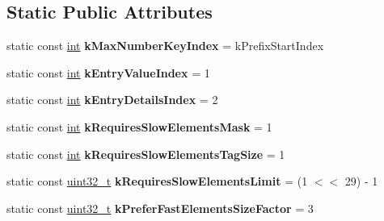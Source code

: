 \subsection*{Static Public Attributes}
\begin{DoxyCompactItemize}
\item 
\mbox{\label{classv8_1_1internal_1_1NumberDictionary_a3ebab9b43233e0ed0f5085d9d9de60d1}} 
static const \mbox{\hyperlink{classint}{int}} {\bfseries k\+Max\+Number\+Key\+Index} = k\+Prefix\+Start\+Index
\item 
\mbox{\label{classv8_1_1internal_1_1NumberDictionary_ae24255866e042546f2415291bbb2ce25}} 
static const \mbox{\hyperlink{classint}{int}} {\bfseries k\+Entry\+Value\+Index} = 1
\item 
\mbox{\label{classv8_1_1internal_1_1NumberDictionary_a76c8f74ae7a83709413dfa422b0cda31}} 
static const \mbox{\hyperlink{classint}{int}} {\bfseries k\+Entry\+Details\+Index} = 2
\item 
\mbox{\label{classv8_1_1internal_1_1NumberDictionary_ab0de5cae9e966f5527c9c24165b666e5}} 
static const \mbox{\hyperlink{classint}{int}} {\bfseries k\+Requires\+Slow\+Elements\+Mask} = 1
\item 
\mbox{\label{classv8_1_1internal_1_1NumberDictionary_aa874bb1a24bd0b237a6dfc4cf61110dc}} 
static const \mbox{\hyperlink{classint}{int}} {\bfseries k\+Requires\+Slow\+Elements\+Tag\+Size} = 1
\item 
\mbox{\label{classv8_1_1internal_1_1NumberDictionary_a74e939aa562f803d1aa7d74d2f30c2db}} 
static const \mbox{\hyperlink{classuint32__t}{uint32\+\_\+t}} {\bfseries k\+Requires\+Slow\+Elements\+Limit} = (1 $<$$<$ 29) -\/ 1
\item 
\mbox{\label{classv8_1_1internal_1_1NumberDictionary_a2516f94e1a76b8bffe2c5ee4850a49b7}} 
static const \mbox{\hyperlink{classuint32__t}{uint32\+\_\+t}} {\bfseries k\+Prefer\+Fast\+Elements\+Size\+Factor} = 3
\end{DoxyCompactItemize}
